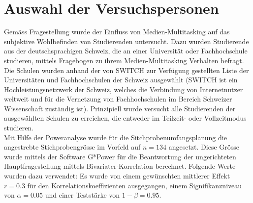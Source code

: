 \section{Auswahl der Versuchspersonen}\label{section.auswahlVersuchsp}
Gemäss Fragestellung wurde der Einfluss von Medien-Multitasking auf das subjektive Wohlbefinden von Studierenden untersucht. Dazu wurden Studierende aus der deutschsprachigen Schweiz, die an einer Universität oder Fachhochschule studieren, mittels Fragebogen zu ihrem Medien-Multitasking Verhalten befragt. Die Schulen wurden anhand der von SWITCH \cite{Switch2014} zur Verfügung gestellten Liste der Universitäten und Fachhochschulen der Schweiz ausgewählt (SWITCH ist ein Hochleistungsnetzwerk der Schweiz, welches die Verbindung von Internetnutzer weltweit und für die Vernetzung von Fachhochschulen im Bereich Schweizer Wissenschaft zuständig ist). Prinzipiell wurde versucht alle Studierenden der ausgewählten Schulen zu erreichen, die entweder im Teilzeit- oder Vollzeitmodus studieren. \\
Mit Hilfe der Poweranalyse \cite{Faul2009} wurde für die Sitchprobenumfangsplanung die angestrebte  Stichprobengrösse im Vorfeld auf $n = 134$ angesetzt. Diese Grösse wurde mittels der Software G*Power \cite{Gpower2014} für die Beantwortung der ungerichteten Hauptfragestellung mittels Bivariater-Korrelation berechnet. Folgende Werte wurden dazu verwendet: Es wurde von einem gewünschten mittlerer Effekt $r = 0.3$  \cite{Cohen1988} für den Korrelationskoeffizienten ausgegangen, einem Signifikanzniveau von $\alpha=0.05$ und einer Teststärke von $1-\beta=0.95$.
